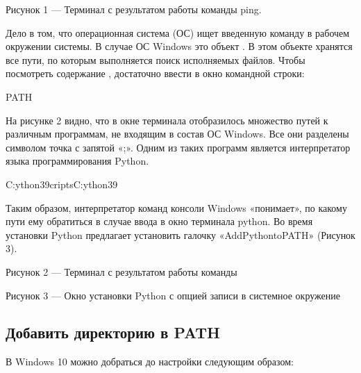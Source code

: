 \documentclass[letterpaper,10pt,russian]{sphinxmanual}
\begin{document}
\sphinxAtStartPar
{}

\sphinxAtStartPar
Рисунок 1 — Терминал с результатом работы команды ping.

\sphinxAtStartPar
{}
Дело в том, что операционная система (ОС) ищет введенную команду в рабочем окружении системы. В случае ОС Windows это объект . В этом объекте хранятся все пути, по которым выполняется поиск исполняемых файлов.
Чтобы посмотреть содержание , достаточно ввести в окно командной строки:

\begin{sphinxVerbatim}[commandchars=\\\{\}]
\PYGZpc{}PATH\PYGZpc{}
\end{sphinxVerbatim}

\sphinxAtStartPar
На рисунке 2 видно, что в окне терминала отобразилось множество путей к различным программам, не входящим в состав ОС Windows. Все они разделены символом точка с запятой «;». Одним из таких программ является интерпретатор языка программирования Python.

\begin{sphinxVerbatim}[commandchars=\\\{\}]
C:ython39criptsC:ython39
\end{sphinxVerbatim}

\sphinxAtStartPar
Таким образом, интерпретатор команд консоли Windows «понимает», по какому пути ему обратиться в случае ввода в окно терминала python. Во время установки Python предлагает установить галочку «AddPythontoPATH» (Рисунок 3).

\sphinxAtStartPar
{}

\sphinxAtStartPar
Рисунок 2 — Терминал с результатом работы команды 

\sphinxAtStartPar
{}

\sphinxAtStartPar
Рисунок 3 — Окно установки Python с опцией записи в системное окружение 


\subsection{Добавить директорию в PATH}
\label{\detokenize{educational_materials/path_venv/content:path}}
\sphinxAtStartPar
В Windows 10 можно добраться до настройки  следующим образом:
\end{document}
